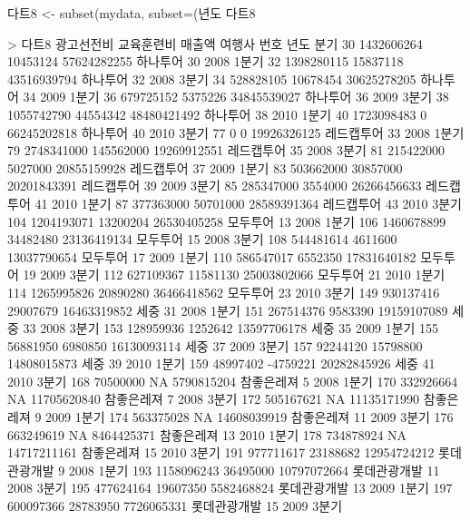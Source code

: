 \begin{Schunk}
\begin{Soutput}
다트8 <- subset(mydata, subset=(년도 %in% c("2008", "2009", "2010") & 분기 %in% c("1분기", "3분기")))
다트8

> 다트8
    광고선전비 교육훈련비      매출액       여행사 번호 년도  분기
30  1432606264   10453124 57624282255     하나투어   30 2008 1분기
32  1398280115   15837118 43516939794     하나투어   32 2008 3분기
34   528828105   10678454 30625278205     하나투어   34 2009 1분기
36   679725152    5375226 34845539027     하나투어   36 2009 3분기
38  1055742790   44554342 48480421492     하나투어   38 2010 1분기
40  1723098483          0 66245202818     하나투어   40 2010 3분기
77           0          0 19926326125   레드캡투어   33 2008 1분기
79  2748341000  145562000 19269912551   레드캡투어   35 2008 3분기
81   215422000    5027000 20855159928   레드캡투어   37 2009 1분기
83   503662000   30857000 20201843391   레드캡투어   39 2009 3분기
85   285347000    3554000 26266456633   레드캡투어   41 2010 1분기
87   377363000   50701000 28589391364   레드캡투어   43 2010 3분기
104 1204193071   13200204 26530405258     모두투어   13 2008 1분기
106 1460678899   34482480 23136419134     모두투어   15 2008 3분기
108  544481614    4611600 13037790654     모두투어   17 2009 1분기
110  586547017    6552350 17831640182     모두투어   19 2009 3분기
112  627109367   11581130 25003802066     모두투어   21 2010 1분기
114 1265995826   20890280 36466418562     모두투어   23 2010 3분기
149  930137416   29007679 16463319852         세중   31 2008 1분기
151  267514376    9583390 19159107089         세중   33 2008 3분기
153  128959936    1252642 13597706178         세중   35 2009 1분기
155   56881950    6980850 16130093114         세중   37 2009 3분기
157   92244120   15798800 14808015873         세중   39 2010 1분기
159   48997402   -4759221 20282845926         세중   41 2010 3분기
168   70500000         NA  5790815204   참좋은레져    5 2008 1분기
170  332926664         NA 11705620840   참좋은레져    7 2008 3분기
172  505167621         NA 11135171990   참좋은레져    9 2009 1분기
174  563375028         NA 14608039919   참좋은레져   11 2009 3분기
176  663249619         NA  8464425371   참좋은레져   13 2010 1분기
178  734878924         NA 14717211161   참좋은레져   15 2010 3분기
191  977711617   23188682 12954724212 롯데관광개발    9 2008 1분기
193 1158096243   36495000 10797072664 롯데관광개발   11 2008 3분기
195  477624164   19607350  5582468824 롯데관광개발   13 2009 1분기
197  600097366   28783950  7726065331 롯데관광개발   15 2009 3분기

\end{Soutput}
\end{Schunk}
